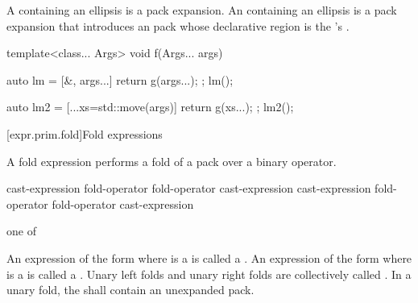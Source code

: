 \pnum
A  containing an ellipsis is a pack
expansion.
%
An  containing an ellipsis is a pack
expansion that introduces an
 pack
whose declarative region is
the 's .
\begin{example}
\begin{codeblock}
template<class... Args>
void f(Args... args) {
  auto lm = [&, args...] { return g(args...); };
  lm();

  auto lm2 = [...xs=std::move(args)] { return g(xs...); };
  lm2();
}
\end{codeblock}
\end{example}

[expr.prim.fold]{Fold expressions}%

\pnum
A fold expression performs a fold of a
pack over a binary operator.

\begin{bnf}
\br
    \terminal{(} cast-expression fold-operator  \terminal{)}\br
    \terminal{(}  fold-operator cast-expression \terminal{)}\br
    \terminal{(} cast-expression fold-operator  fold-operator cast-expression \terminal{)}
\end{bnf}

\begin{bnf}
 \textnormal{one of}\br
    \terminal{+ }\quad\terminal{- }\quad\terminal{* }\quad\terminal{/ }\quad\terminal{\% }\quad\terminal{\caret{} }\quad\terminal{\& }\quad\terminal{| }\quad\terminal{<< }\quad\terminal{>> }\br
    \terminal{+=}\quad\terminal{-=}\quad\terminal{*=}\quad\terminal{/=}\quad\terminal{\%=}\quad\terminal{\caret=}\quad\terminal{\&=}\quad\terminal{|=}\quad\terminal{<<=}\quad\terminal{>>=}\quad\terminal{=}\br
    \terminal{==}\quad\terminal{!=}\quad\terminal{< }\quad\terminal{> }\quad\terminal{<=}\quad\terminal{>=}\quad\terminal{\&\&}\quad\terminal{||}\quad\terminal{,  }\quad{}\quad\terminal{->*}
\end{bnf}

\pnum
{}%
An expression of the form
  
where  is a 
is called a .
An expression of the form
  
where  is a 
is called a .
Unary left folds and unary right folds
are collectively called .
In a unary fold,
the 
shall contain an unexpanded pack.


